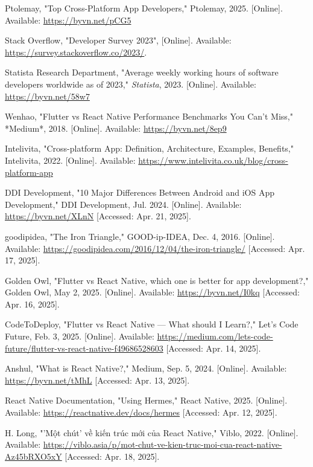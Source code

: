 \documentclass[12pt]{report}
\begin{document}
\begin{thebibliography}{1}
Ptolemay, "Top Cross-Platform App Developers," Ptolemay, 2025. [Online]. Available: \url{https://byvn.net/pCG5}

    
    Stack Overflow, "Developer Survey 2023", [Online]. Available: \url{https://survey.stackoverflow.co/2023/}.
    
Statista Research Department, "Average weekly working hours of software developers worldwide as of 2023," \emph{Statista}, 2023. [Online]. Available: \url{https://byvn.net/58w7}


Wenhao, "Flutter vs React Native Performance Benchmarks You Can't Miss," *Medium*, 2018. [Online]. Available: \url{https://byvn.net/8ep9}


Intelivita, "Cross-platform App: Definition, Architecture, Examples, Benefits," Intelivita, 2022. [Online]. Available: \url{https://www.intelivita.co.uk/blog/cross-platform-app}

DDI Development, "10 Major Differences Between Android and iOS App Development," DDI Development, Jul. 2024. [Online]. Available: \url{https://byvn.net/XLnN} [Accessed: Apr. 21, 2025].

goodipidea, "The Iron Triangle," GOOD-ip-IDEA, Dec. 4, 2016. [Online]. Available: \url{https://goodipidea.com/2016/12/04/the-iron-triangle/} [Accessed: Apr. 17, 2025].

Golden Owl, "Flutter vs React Native, which one is better for app development?," Golden Owl, May 2, 2025. [Online]. Available: \url{https://byvn.net/I0kq} [Accessed: Apr. 16, 2025].

CodeToDeploy, "Flutter vs React Native — What should I Learn?," Let's Code Future, Feb. 3, 2025. [Online]. Available: \url{https://medium.com/lets-code-future/flutter-vs-react-native-f49686528603} [Accessed: Apr. 14, 2025].

Anshul, "What is React Native?," Medium, Sep. 5, 2024. [Online]. Available: \url{https://byvn.net/tMhL} [Accessed: Apr. 13, 2025].

React Native Documentation, "Using Hermes," React Native, 2025. [Online]. Available: \url{https://reactnative.dev/docs/hermes} [Accessed: Apr. 12, 2025].

H. Long, "'Một chút' về kiến trúc mới của React Native," Viblo, 2022. [Online]. Available: \url{https://viblo.asia/p/mot-chut-ve-kien-truc-moi-cua-react-native-Az45bRXO5xY} [Accessed: Apr. 18, 2025].


\end{thebibliography}
\end{document}
